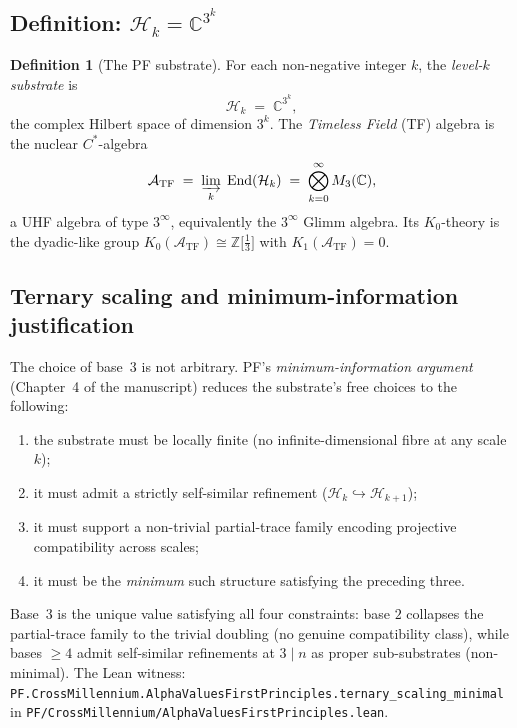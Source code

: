 \documentclass[11pt,a4paper]{article}
\theoremstyle{definition}
\newtheorem{definition}[theorem]{Definition}
\theoremstyle{remark}
\newcommand{\complexes}{\mathbb{C}}
\newcommand{\integers}{\mathbb{Z}}
\newcommand{\HilbertK}{\mathcal{H}_{k}}
\newcommand{\TF}{\mathcal{A}_{\mathrm{TF}}}
\newcommand{\lean}[1]{\texttt{\small #1}}
\begin{document}
\subsection{Definition: $\HilbertK = \complexes^{3^{k}}$}

\begin{definition}[The PF substrate]\label{def:substrate}
For each non-negative integer $k$, the \emph{level-$k$ substrate}
is
\[
  \HilbertK \;=\; \complexes^{3^{k}},
\]
the complex Hilbert space of dimension $3^{k}$. The
\emph{Timeless Field} (TF) algebra is the nuclear $C^{*}$-algebra
\[
  \TF \;=\; \varinjlim_{k}\; \mathrm{End}(\HilbertK)
  \;=\; \bigotimes_{k=0}^{\infty} M_{3}(\complexes),
\]
a UHF algebra of type $3^{\infty}$, equivalently the
$3^{\infty}$ Glimm algebra. Its $K_{0}$-theory is the dyadic-like
group
\(
  K_{0}(\TF) \cong \integers\bigl[\tfrac{1}{3}\bigr]
\)
with $K_{1}(\TF) = 0$.
\end{definition}

\subsection{Ternary scaling and minimum-information justification}

The choice of base~$3$ is not arbitrary. PF's
\emph{minimum-information argument} (Chapter~4 of the manuscript)
reduces the substrate's free choices to the following:

\begin{enumerate}
\item the substrate must be locally finite (no infinite-dimensional
fibre at any scale~$k$);
\item it must admit a strictly self-similar refinement
($\HilbertK \hookrightarrow \mathcal{H}_{k+1}$);
\item it must support a non-trivial partial-trace family
encoding projective compatibility across scales;
\item it must be the \emph{minimum} such structure satisfying the
preceding three.
\end{enumerate}

Base~$3$ is the unique value satisfying all four constraints: base
$2$ collapses the partial-trace family to the trivial doubling
(no genuine compatibility class), while bases $\ge 4$ admit
self-similar refinements at $3 \mid n$ as proper sub-substrates
(non-minimal). The Lean witness:
\lean{PF.CrossMillennium.AlphaValuesFirstPrinciples.ternary\_scaling\_minimal} in
\lean{PF/CrossMillennium/AlphaValuesFirstPrinciples.lean}.
\end{document}
